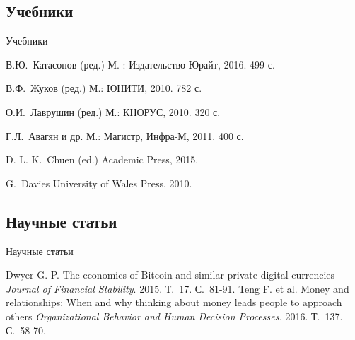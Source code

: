 \documentclass[_DKB_p1_Money.tex]{subfiles}
\begin{document}
\subsection*{Учебники}



\begin{frame}[allowframebreaks]{Учебники}
    
  \begin{thebibliography}{10}
    
  \beamertemplatebookbibitems

  В.Ю.~Катасонов (ред.)
	\newblock М. : Издательство Юрайт, 2016. 499 с.
	
  В.Ф.~Жуков (ред.)
  \newblock М.: ЮНИТИ, 2010. 782 с.
  
  О.И.~Лаврушин (ред.)
  \newblock М.: КНОРУС, 2010. 320 с.
  
  \pagebreak  
	Г.Л.~Авагян и др. 
	\newblock М.: Магистр, Инфра-М, 2011. 400 с.
	
	D. L. K.~Chuen  (ed.)
	\newblock Academic Press, 2015.

	G.~Davies
	\newblock University of Wales Press, 2010.

  \end{thebibliography}
\end{frame}

\subsection*{Научные статьи}

\begin{frame}{Научные статьи}
  \begin{thebibliography}{10}
  \beamertemplatearticlebibitems
	\newblock Dwyer G. P. 
	\newblock The economics of Bitcoin and similar private digital 		currencies {\em Journal of Financial Stability}. 2015. Т.~17. С.~81-91.
	\newblock Teng F. et al. 
	\newblock Money and relationships: When and why thinking about money leads people to approach others {\em Organizational Behavior and Human Decision Processes.} 2016. Т.~137. С.~58-70.
  \end{thebibliography}
\end{frame}
\end{document}
